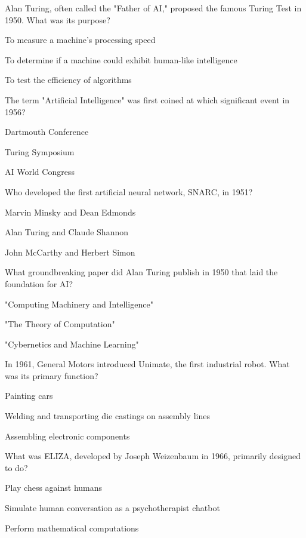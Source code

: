 
\begin{enhancedmcq}{Alan Turing, often called the "Father of AI," proposed the famous Turing Test in 1950. What was its purpose?}
\item To measure a machine's processing speed
\item To determine if a machine could exhibit human-like intelligence
\item To test the efficiency of algorithms

\end{enhancedmcq}
\begin{enhancedmcq}{The term "Artificial Intelligence" was first coined at which significant event in 1956?}
\item Dartmouth Conference
\item Turing Symposium
\item AI World Congress

\end{enhancedmcq}
\begin{enhancedmcq}{Who developed the first artificial neural network, SNARC, in 1951?}
\item Marvin Minsky and Dean Edmonds
\item Alan Turing and Claude Shannon
\item John McCarthy and Herbert Simon

\end{enhancedmcq}
\begin{enhancedmcq}{What groundbreaking paper did Alan Turing publish in 1950 that laid the foundation for AI?}
\item "Computing Machinery and Intelligence"
\item "The Theory of Computation"
\item "Cybernetics and Machine Learning"

\end{enhancedmcq}
\begin{enhancedmcq}{In 1961, General Motors introduced Unimate, the first industrial robot. What was its primary function?}
\item Painting cars
\item Welding and transporting die castings on assembly lines
\item Assembling electronic components

\end{enhancedmcq}
\begin{enhancedmcq}{What was ELIZA, developed by Joseph Weizenbaum in 1966, primarily designed to do?}
\item Play chess against humans
\item Simulate human conversation as a psychotherapist chatbot
\item Perform mathematical computations

\end{enhancedmcq}
